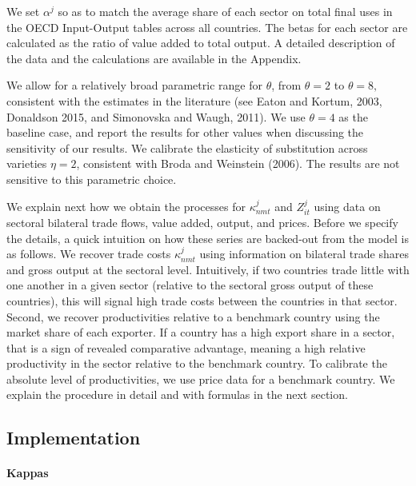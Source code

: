 \documentclass[12pt]{article}
\begin{document}
We set $\alpha ^{j}$ so as to match the average share of each sector on
total final uses in the OECD Input-Output tables across all countries. The
betas for each sector are calculated as the ratio of value added to total
output. A detailed description of the data and the calculations are
available in the Appendix.

We allow for a relatively broad parametric range for $\theta $, from $\theta
=2$ to $\theta =8,$ consistent with the estimates in the literature (see
Eaton and Kortum, 2003, Donaldson 2015, and Simonovska and Waugh, 2011). We
use $\theta =4$ as the baseline case, and report the results for other
values when discussing the sensitivity of our results. We calibrate the
elasticity of substitution across varieties $\eta =2$, consistent with Broda
and Weinstein (2006). The results are not sensitive to this parametric
choice.

We explain next how we obtain the processes for $\kappa _{nmt}^{j}$ and $%
Z_{it}^{j}$ using data on sectoral bilateral trade flows, value added,
output, and prices. Before we specify the details, a quick intuition on how
these series are backed-out from the model is as follows. We recover trade
costs $\kappa _{nmt}^{j}$ using information on bilateral trade shares and
gross output at the sectoral level. Intuitively, if two countries trade
little with one another in a given sector (relative to the sectoral gross
output of these countries), this will signal high trade costs between the
countries in that sector. Second, we recover productivities relative to a
benchmark country using the market share of each exporter. If a country has
a high export share in a sector, that is a sign of revealed comparative
advantage, meaning a high relative productivity in the sector relative to
the benchmark country. To calibrate the absolute level of productivities, we
use price data for a benchmark country. We explain the procedure in detail
and with formulas in the next section.

\subsection{Implementation}

\paragraph{Kappas}
\end{document}
